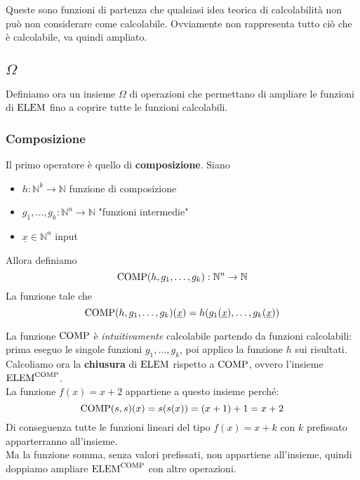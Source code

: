 Queste sono funzioni di partenza che qualsiasi idea teorica di calcolabilità non può non considerare come calcolabile. Ovviamente non rappresenta tutto ciò che è calcolabile, va quindi ampliato.\\

\subsection{$\Omega$}
Definiamo ora un insieme $\Omega$ di operazioni che permettano di ampliare le funzioni di $\text{ELEM}$ fino a coprire tutte le funzioni calcolabili.\\

\subsubsection{Composizione}
Il primo operatore è quello di \textbf{composizione}. Siano
\begin{itemize}
	\item $h: \mathbb{N}^k \rightarrow \mathbb{N}$ funzione di composizione
	\item $g_1, \dots, g_k: \mathbb{N}^n \rightarrow \mathbb{N}$ "funzioni intermedie"
	\item $\underline{x} \in \mathbb{N}^n$ input
\end{itemize}
Allora definiamo 
$$ \text{COMP} (h, g_1, \dots, g_k): \mathbb{N}^n \rightarrow \mathbb{N} $$
La funzione tale che
$$ \text{COMP} (h, g_1, \dots, g_k) (\underline{x}) = h(g_1(\underline{x}), \dots, g_k (\underline{x})) $$

\begin{center}
	
\end{center}

La funzione $\text{COMP}$ è \textit{intuitivamente} calcolabile partendo da funzioni calcolabili: prima eseguo le singole funzioni $g_1, \dots, g_k$, poi applico la funzione $h$ sui risultati.\\

Calcoliamo ora la \textbf{chiusura} di $\text{ELEM}$ rispetto a $\text{COMP}$, ovvero l'insieme $\text{ELEM}^{\text{COMP}}$.\\

La funzione $f(x) = x + 2$ appartiene a questo insieme perché:
$$ \text{COMP}(s,s)(x) = s(s(x)) = (x + 1) + 1 = x + 2 $$
Di conseguenza tutte le funzioni lineari del tipo $f(x) = x + k$ con $k$ prefissato apparterranno all'insieme.\\

Ma la funzione somma, senza valori prefissati, non appartiene all'insieme, quindi doppiamo ampliare $\text{ELEM}^{\text{COMP}}$ con altre operazioni.\\

